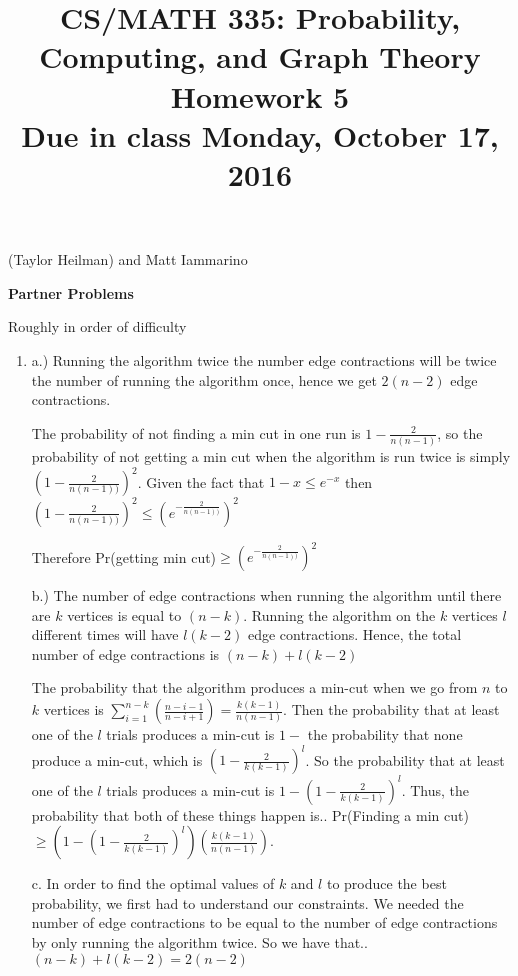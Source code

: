 \documentclass[11pt]{amsart}
\begin{document}
\title[CS/MATH 335 HW 5]{CS/MATH 335: Probability, Computing, and Graph Theory \\ Homework 5\\ Due in class Monday, October 17, 2016}
\maketitle

{(Taylor Heilman) and Matt Iammarino}

\textbf{Partner Problems}

Roughly in order of difficulty

\begin{enumerate}

\item {} 
{
a.)  Running the algorithm twice the number edge contractions will be twice the number of running the algorithm once, hence we get $2(n-2)$ edge contractions.

The probability of not finding a min cut in one run is $1- \frac{2}{n(n-1)}$, so the probability of not getting a min cut when the algorithm is run twice is simply $(1- \frac{2}{n(n-1))})^2$.  Given the fact that $1-x \leq e^{-x}$ then $(1- \frac{2}{n(n-1))})^2 \leq (e^{ - \frac{2}{n(n-1))}})^2$ 

Therefore Pr(getting min cut)$ \geq (e^{ - \frac{2}{n(n-1))}})^2$ 
\newline

b.)  The number of edge contractions when running the algorithm until there are $k$ vertices is equal to $(n-k)$.  Running the algorithm on the $k$ vertices $l$ different times will have $l(k-2)$ edge contractions.  Hence, the total number of edge contractions is $(n-k) + l(k-2)$

The probability that the algorithm produces a min-cut when we go from $n$ to $k$ vertices is $\sum_{i=1}^{n-k} (\frac{n-i-1}{n-i+1}) = \frac{k(k-1)}{n(n-1)}$. Then the probability that at least one of the $l$ trials produces a min-cut is $1- $ the probability that none produce a min-cut, which is $(1 - \frac{2}{k(k-1)})^{l}$. So the probability that at least one of the $l$ trials produces a min-cut is $1 - (1 - \frac{2}{k(k-1)})^{l}$. Thus, the probability that both of these things happen is.. \newline
Pr(Finding a min cut) $\geq (1 - (1 - \frac{2}{k(k-1)})^{l})(\frac{k(k-1)}{n(n-1)})$.\newline

c. In order to find the optimal values of $k$ and $l$ to produce the best probability, we first had to understand our constraints. We needed the number of edge contractions to be equal to the number of edge contractions by only running the algorithm twice. So we have that.. \newline
 $(n-k) + l(k-2) = 2(n-2)$ \newline
 
}
\end{enumerate}
\end{document}
